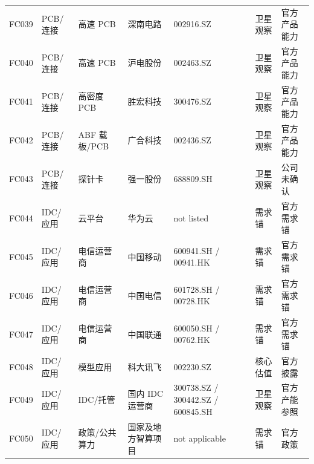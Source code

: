 \begin{exhibitbox}
\begin{longtable}{L{1.0cm}L{2.2cm}L{2.5cm}L{3.0cm}L{2.2cm}L{2.0cm}L{1.8cm}}
FC039 & PCB/连接 & 高速 PCB & 深南电路 & 002916.SZ & 卫星观察 & 官方产品能力\\
FC040 & PCB/连接 & 高速 PCB & 沪电股份 & 002463.SZ & 卫星观察 & 官方产品能力\\
FC041 & PCB/连接 & 高密度 PCB & 胜宏科技 & 300476.SZ & 卫星观察 & 官方产品能力\\
FC042 & PCB/连接 & ABF 载板/PCB & 广合科技 & 002436.SZ & 卫星观察 & 官方产品能力\\
FC043 & PCB/连接 & 探针卡 & 强一股份 & 688809.SH & 卫星观察 & 公司未确认\\
FC044 & IDC/应用 & 云平台 & 华为云 & not listed & 需求锚 & 官方需求锚\\
FC045 & IDC/应用 & 电信运营商 & 中国移动 & 600941.SH / 00941.HK & 需求锚 & 官方需求锚\\
FC046 & IDC/应用 & 电信运营商 & 中国电信 & 601728.SH / 00728.HK & 需求锚 & 官方需求锚\\
FC047 & IDC/应用 & 电信运营商 & 中国联通 & 600050.SH / 00762.HK & 需求锚 & 官方需求锚\\
FC048 & IDC/应用 & 模型应用 & 科大讯飞 & 002230.SZ & 核心估值 & 官方披露\\
FC049 & IDC/应用 & IDC/托管 & 国内 IDC 运营商 & 300738.SZ / 300442.SZ / 600845.SH & 卫星观察 & 官方产能参照\\
FC050 & IDC/应用 & 政策/公共算力 & 国家及地方智算项目 & not applicable & 需求锚 & 官方政策\\
\bottomrule
\end{longtable}
\end{exhibitbox}
